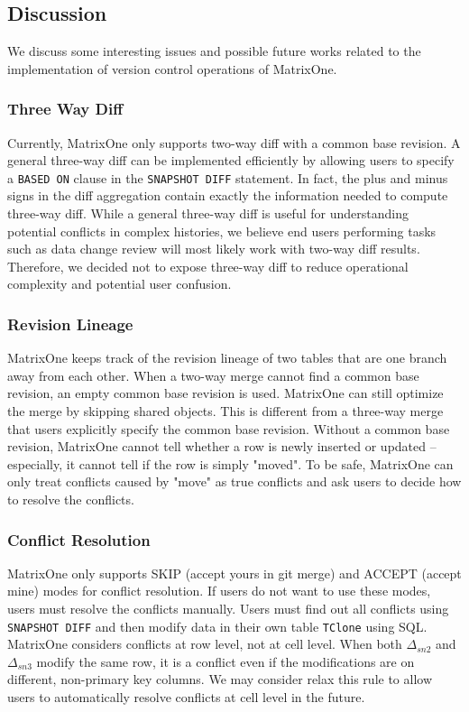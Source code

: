 \documentclass[sigconf,nonacm]{acmart} %
\begin{document}
\subsection{Discussion} \label{sec:discussion}
We discuss some interesting issues and possible future works related to 
the implementation of version control operations of MatrixOne.

\subsubsection{Three Way Diff}
Currently, MatrixOne only supports two-way diff with a common base revision.  
A general three-way diff can be implemented efficiently by allowing users to specify 
a \texttt{BASED ON} clause in the \texttt{SNAPSHOT DIFF} statement. In fact, the plus 
and minus signs in the diff aggregation contain exactly the information needed to compute 
three-way diff. While a general three-way diff is useful for understanding potential 
conflicts in complex histories, we believe end users performing tasks such as data change 
review will most likely work with two-way diff results. Therefore, we decided not to expose 
three-way diff to reduce operational complexity and potential user confusion.

\subsubsection{Revision Lineage}
MatrixOne keeps track of the revision lineage of two tables that are one 
branch away from each other.  When a two-way merge cannot find a common 
base revision, an empty common base revision is used.  MatrixOne can 
still optimize the merge by skipping shared objects.  This is different 
from a three-way merge that users explicitly specify the common base revision.
Without a common base revision, MatrixOne cannot tell whether a row is newly 
inserted or updated -- especially, it cannot tell if the row is simply "moved".
To be safe, MatrixOne can only treat conflicts caused by "move" as true 
conflicts and ask 
users to decide how to resolve the conflicts.

\subsubsection{Conflict Resolution}
MatrixOne only supports SKIP (accept yours in git merge) and ACCEPT (accept mine)
modes for conflict resolution.  If users do not want to use these modes, users
must resolve the conflicts manually.  Users must find out all conflicts using
\texttt{SNAPSHOT DIFF} and then modify data in their own table \texttt{TClone} 
using SQL.  MatrixOne considers conflicts at row level, not at cell level.  
When both $\Delta_{sn2}$ and $\Delta_{sn3}$ modify the same row, it is a 
conflict even if the modifications are on different, non-primary key columns.  
We may consider relax this rule to allow users to automatically resolve 
conflicts at cell level in the future.
\end{document}
